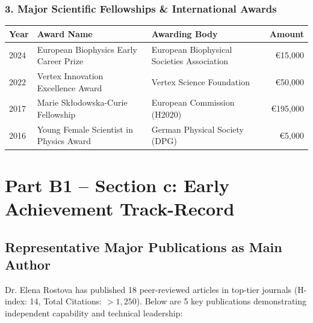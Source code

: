 \documentclass[11pt,a4paper]{article}
\begin{document}
\subsubsection*{3. Major Scientific Fellowships \& International Awards}
\begin{tabularx}{\textwidth}{@{}l p{4.5cm} X r@{}}
  \toprule
  \textbf{Year} & \textbf{Award Name} & \textbf{Awarding Body} & \textbf{Amount} \\
  \midrule
  2024 & European Biophysics Early Career Prize & European Biophysical Societies Association & \euro 15,000 \\
  2022 & Vertex Innovation Excellence Award & Vertex Science Foundation & \euro 50,000 \\
  2017 & Marie Sk\l odowska-Curie Fellowship & European Commission (H2020) & \euro 195,000 \\
  2016 & Young Female Scientist in Physics Award & German Physical Society (DPG) & \euro 5,000 \\
  \bottomrule
\end{tabularx}

\vspace{10pt}

\section*{Part B1 -- Section c: Early Achievement Track-Record}

\subsection*{Representative Major Publications as Main Author}
Dr. Elena Rostova has published 18 peer-reviewed articles in top-tier journals (H-index: 14, Total Citations: $>1,250$). Below are 5 key publications demonstrating independent capability and technical leadership:
\end{document}
